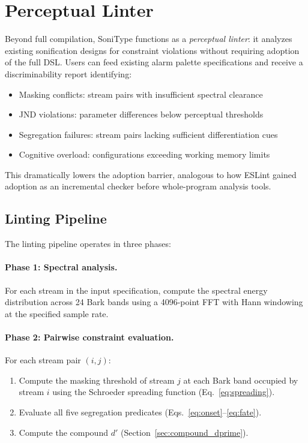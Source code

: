 \documentclass[sigchi, nonacm]{acmart}
\begin{document}
\section{Perceptual Linter}
\label{sec:linter}

Beyond full compilation, SoniType functions as a \emph{perceptual linter}: it analyzes existing sonification designs for constraint violations without requiring adoption of the full DSL. Users can feed existing alarm palette specifications and receive a discriminability report identifying:

\begin{itemize}
    \item Masking conflicts: stream pairs with insufficient spectral clearance
    \item JND violations: parameter differences below perceptual thresholds
    \item Segregation failures: stream pairs lacking sufficient differentiation cues
    \item Cognitive overload: configurations exceeding working memory limits
\end{itemize}

This dramatically lowers the adoption barrier, analogous to how ESLint gained adoption as an incremental checker before whole-program analysis tools.

\subsection{Linting Pipeline}

The linting pipeline operates in three phases:

\paragraph{Phase 1: Spectral analysis.} For each stream in the input specification, compute the spectral energy distribution across 24 Bark bands using a 4096-point FFT with Hann windowing at the specified sample rate.

\paragraph{Phase 2: Pairwise constraint evaluation.} For each stream pair $(i, j)$:
\begin{enumerate}
    \item Compute the masking threshold of stream $j$ at each Bark band occupied by stream $i$ using the Schroeder spreading function (Eq.~\ref{eq:spreading}).
    \item Evaluate all five segregation predicates (Eqs.~\ref{eq:onset}--\ref{eq:fate}).
    \item Compute the compound $d'$ (Section~\ref{sec:compound_dprime}).
\end{enumerate}
\end{document}
